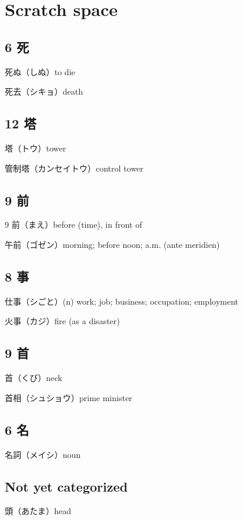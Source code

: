 \chapter{Scratch space}

\section{6 死}

死ぬ（しぬ）to die

死去（シキョ）death

\section{12 塔}

塔（トウ）tower

管制塔（カンセイトウ）control tower

\section{9 前}

9 前（まえ）before (time), in front of

午前（ゴゼン）morning; before noon; a.m. (ante meridien)

\section{8 事}

仕事（シごと）(n) work; job; business; occupation; employment

火事（カジ）fire (as a disaster)

\section{9 首}

首（くび）neck

首相（シュショウ）prime minister

\section{6 名}

名詞（メイシ）noun

\section{Not yet categorized}

頭（あたま）head

